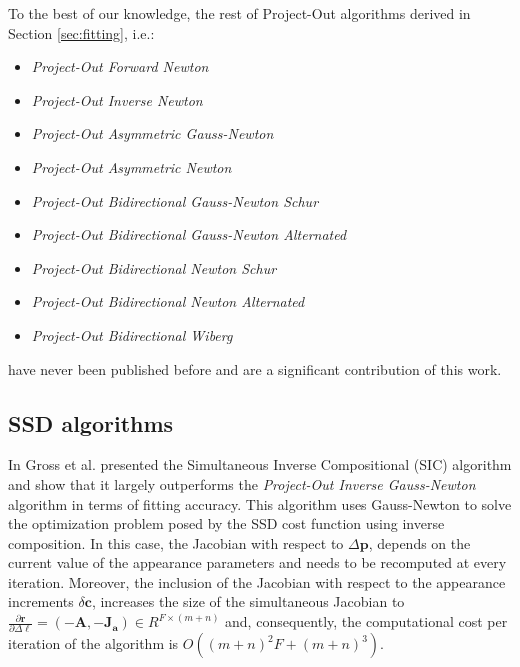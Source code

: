 To the best of our knowledge, the rest of Project-Out algorithms derived in Section \ref{sec:fitting}, i.e.:
\begin{itemize}
\item \emph{Project-Out Forward Newton}
\item \emph{Project-Out Inverse Newton}
\item \emph{Project-Out Asymmetric Gauss-Newton}
\item \emph{Project-Out Asymmetric Newton}
\item \emph{Project-Out Bidirectional Gauss-Newton Schur}
\item \emph{Project-Out Bidirectional Gauss-Newton Alternated}
\item \emph{Project-Out Bidirectional Newton Schur}
\item \emph{Project-Out Bidirectional Newton Alternated}
\item \emph{Project-Out Bidirectional Wiberg}
\end{itemize}
have never been published before and are a significant contribution of this work.

\subsection{SSD algorithms}

In \cite{Gross2005} Gross et al. presented the Simultaneous Inverse Compositional (SIC) algorithm and show that it largely outperforms the \emph{Project-Out Inverse Gauss-Newton} algorithm in terms of fitting accuracy. This algorithm uses Gauss-Newton to solve the optimization problem posed by the SSD cost function using inverse composition. In this case, the Jacobian with respect to $\Delta\mathbf{p}$, depends on the current value of the appearance parameters and needs to be recomputed at every iteration. Moreover, the inclusion of the Jacobian with respect to the appearance increments $\delta\mathbf{c}$, increases the size of the simultaneous Jacobian to $\frac{\partial\mathbf{r}}{\partial\Delta\boldsymbol{\ell}} = \left( -\mathbf{A}, -\mathbf{J}_\mathbf{a} \right) \in R^{F \times (m + n)}$ and, consequently, the computational cost per iteration of the algorithm is $O((m + n)^2F + (m + n)^3)$.

